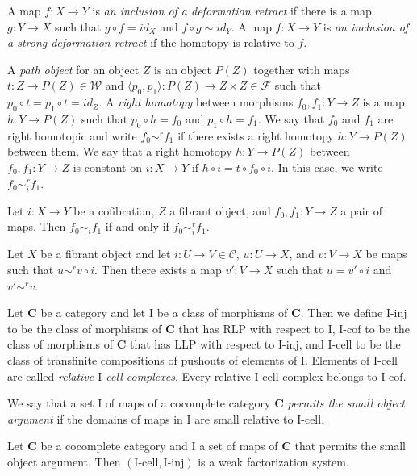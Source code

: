 \documentclass{amsart}
\theoremstyle{definition}
\newcommand{\we}{\mathcal{W}}
\newcommand{\fib}{\mathcal{F}}
\newcommand{\cof}{\mathcal{C}}
\newcommand{\cat}[1]{\mathbf{#1}}
\newcommand{\C}{\cat{C}}
\newcommand{\I}{\mathrm{I}}
\newcommand{\class}[2]{#1\text{-}\mathrm{#2}}
\newcommand{\Iinj}[1][\I]{\class{#1}{inj}}
\newcommand{\Icell}[1][\I]{\class{#1}{cell}}
\newcommand{\Icof}[1][\I]{\class{#1}{cof}}
\begin{document}
A map $f : X \to Y$ is \emph{an inclusion of a deformation retract} if there is
a map $g : Y \to X$ such that $g \circ f = id_X$ and $f \circ g \sim id_Y$.
A map $f : X \to Y$ is \emph{an inclusion of a strong deformation retract} if the homotopy is relative to $f$.

A \emph{path object} for an object $Z$ is an object $P(Z)$ together with maps $t : Z \to P(Z) \in \we$
and $\langle p_0,p_1 \rangle : P(Z) \to Z \times Z \in \fib$ such that $p_0 \circ t = p_1 \circ t = id_Z$.
A \emph{right homotopy} between morphisms $f_0,f_1 : Y \to Z$ is a map
$h : Y \to P(Z)$ such that $p_0 \circ h = f_0$ and $p_1 \circ h = f_1$.
We say that $f_0$ and $f_1$ are right homotopic and write $f_0 \sim^r f_1$
if there exists a right homotopy $h : Y \to P(Z)$ between them.
We say that a right homotopy $h : Y \to P(Z)$ between $f_0,f_1 : Y \to Z$
is constant on $i : X \to Y$ if $h \circ i = t \circ f_0 \circ i$.
In this case, we write $f_0 \sim^r_i f_1$.

\begin{prop}
Let $i : X \to Y$ be a cofibration, $Z$ a fibrant object, and $f_0,f_1 : Y \to Z$ a pair of maps.
Then $f_0 \sim_i f_1$ if and only if $f_0 \sim^r_i f_1$.
\end{prop}

\begin{prop}
Let $X$ be a fibrant object and let $i : U \to V \in \cof$, $u : U \to X$, and $v : V \to X$ be maps such that $u \sim^r v \circ i$.
Then there exists a map $v' : V \to X$ such that $u = v' \circ i$ and $v' \sim^r v$.
\end{prop}

Let $\C$ be a category and let $\I$ be a class of morphisms of $\C$.
Then we define $\Iinj$ to be the class of morphisms of $\C$ that has RLP with respect to $\I$,
$\Icof$ to be the class of morphisms of $\C$ that has LLP with respect to $\Iinj$, and
$\Icell$ to be the class of transfinite compositions of pushouts of elements of $\I$.
Elements of $\Icell$ are called \emph{relative $\I$-cell complexes}.
Every relative $\I$-cell complex belongs to $\Icof$.

We say that a set $\I$ of maps of a cocomplete category $\C$ \emph{permits the small object argument}
if the domains of maps in $\I$ are small relative to $\Icell$.

\begin{prop}
Let $\C$ be a cocomplete category and $\I$ a set of maps of $\C$ that permits the small object argument.
Then $(\Icell,\Iinj)$ is a weak factorization system.
\end{prop}
\end{document}
